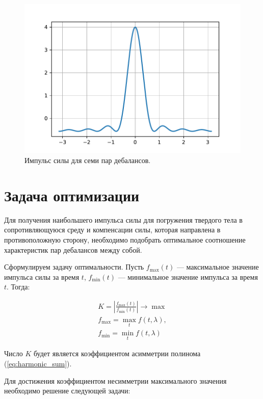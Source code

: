 \begin{figure}[h]
    \centering
    \includegraphics[width=1\linewidth]{grap/impulse_7.pdf}
    \caption{Импульс силы для семи пар дебалансов.}
    \label{grap:impulse_7}
\end{figure}


\clearpage
\section{Задача оптимизации}

Для получения наибольшего импульса силы для погружения твердого тела в сопротивляющуюся среду и компенсации силы, которая направлена в противоположную сторону, необходимо подобрать оптимальное соотношение характеристик пар дебалансов между собой.

Сформулируем задачу оптимальности. Пусть $f_{\max}(t)$ --- максимальное значение импульса силы за время $t$, $f_{\min}(t)$ --- минимальное значение импульса за время $t$. Тогда:

\begin{equation}\label{eq:optim}
    \begin{gathered}
        K = \left| \frac{f_{\max}(t)}{f_{\min}(t)} \right| \rightarrow \max \\
        f_{\max} = \max_t f(t, \lambda),\\
        f_{\min} = \min_t f(t, \lambda)
    \end{gathered}
\end{equation}

Число $K$ будет является коэффициентом асимметрии полинома (\ref{eq:harmonic_sum}).

Для достижения коэффициентом несимметрии максимального значения необходимо решение следующей задачи:

